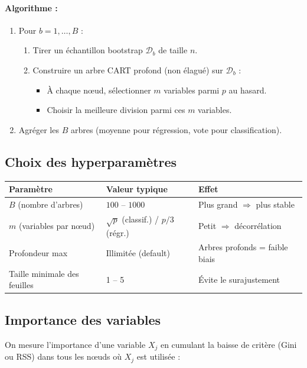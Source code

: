 \documentclass[a4paper,11pt]{article}
\begin{document}
\paragraph{Algorithme :}
\begin{enumerate}
    \item Pour $b = 1, \ldots, B$ :
    \begin{enumerate}
        \item Tirer un échantillon bootstrap $\mathcal{D}_b$ de taille $n$.
        \item Construire un arbre CART profond (non élagué) sur $\mathcal{D}_b$ :
        \begin{itemize}
            \item À chaque nœud, sélectionner $m$ variables parmi $p$ au hasard.
            \item Choisir la meilleure division parmi ces $m$ variables.
        \end{itemize}
    \end{enumerate}
    \item Agréger les $B$ arbres (moyenne pour régression, vote pour classification).
\end{enumerate}

\subsection{Choix des hyperparamètres}

\begin{tabular}{lll}
\toprule
\textbf{Paramètre} & \textbf{Valeur typique} & \textbf{Effet} \\
\midrule
$B$ (nombre d'arbres) & $100$ -- $1000$ & Plus grand $\Rightarrow$ plus stable \\
$m$ (variables par nœud) & $\sqrt{p}$ (classif.) / $p/3$ (régr.) & Petit $\Rightarrow$ décorrélation \\
Profondeur max & Illimitée (default) & Arbres profonds = faible biais \\
Taille minimale des feuilles & 1 -- 5 & Évite le surajustement \\
\bottomrule
\end{tabular}

\subsection{Importance des variables}

On mesure l'importance d'une variable $X_j$ en cumulant la baisse de critère (Gini ou RSS) dans tous les nœuds où $X_j$ est utilisée :
\end{document}
